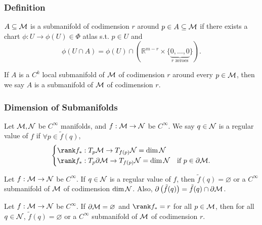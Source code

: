 \documentclass[../main.tex]{subfiles}
\begin{document}
    \subsubsection{Definition}
    \begin{definition}\label{def:local-submanifold}
        \(A \subseteq \manifold[M]\) is a submanifold of codimension \(r\) around 
        \(p \in A \subseteq \manifold[M]\) if there exists a chart 
        \(\phi : U \to \phi(U) \in \Phi\) atlas s.t. \(p \in U\) and 
        \[
        \phi(U \cap A) = \phi(U) \cap (\mathbb{R}^{m-r} \times 
        \{\underbrace{0, \dots, 0}_{r\text{ zeroes}}\}).
        \]
    \end{definition}
    \begin{definition}[Submanifold]\label{def:submanifold}
        If \(A\) is a \(C^k\) local submanifold of \(\manifold[M]\) of codimension 
        \(r\) around every \(p \in \manifold[M]\), then we say \(A\) is a 
        submanifold of \(\manifold[M]\) of codimension \(r\).
    \end{definition}

    \subsubsection{Dimension of Submanifolds}
    \begin{definition}\label{def:regular-value}
        Let \(\manifold[M], \manifold[N]\) be \(C^\infty\) manifolds, and 
        \(f : \manifold[M] \to \manifold[N]\) be \(C^\infty\). We say 
        \(q \in \manifold[N]\) is a regular value of \(f\) if \(\forall p 
        \in \tilde{f}(q)\), 
        \[
        \begin{cases}
        \rank f_* : T_p\manifold[M] \to T_{f(p)}\manifold[N] = 
            \dim \manifold[N] &\\
        \rank f_* : T_p\partial \manifold[M] \to T_{f(p)}\manifold[N] = 
            \dim \manifold[N] & \text{if } p \in \partial \manifold[M].
        \end{cases}
        \]
    \end{definition}
    \begin{theorem}\label{thm:regular-value-submanifold-with-boundary}
        Let \(f : \manifold[M] \to \manifold[N]\) be \(C^\infty\).
        If \(q \in \manifold[N]\) is a regular value of \(f\), then 
        \(\tilde{f}(q) = \varnothing\) or a \(C^\infty\) submanifold of 
        \(\manifold[M]\) of codimension \(\dim \manifold[N]\). Also, 
        \(\partial \left(\tilde{f}(q)\right)=\tilde{f}(q)\cap \partial 
        \manifold[M]\).
    \end{theorem}
    \begin{theorem}\label{thm:equation-submanifold-no-boundary}
        Let \(f : \manifold[M] \to \manifold[N]\) be \(C^\infty\).
        If \(\partial \manifold[M] = \varnothing\) and 
        \(\rank f_* = r\) for all \(p \in \manifold[M]\), then for all \(q \in 
        \manifold[N]\), \(\tilde{f}(q) = \varnothing\) or a \(C^\infty\) 
        submanifold of \(\manifold[M]\) of codimension \(r\).
    \end{theorem}
\end{document}
